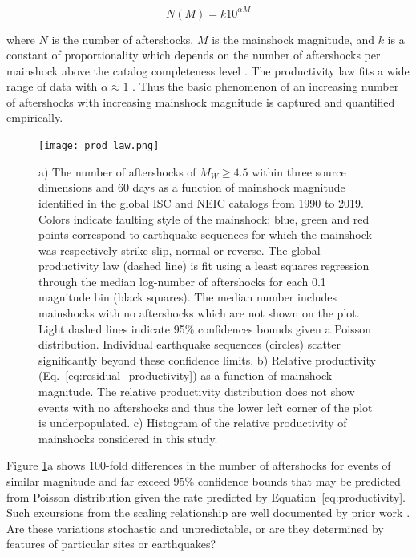 \documentclass[draft, jgrga]{agujournal2018}
\begin{document}
\begin{linenomath*}
\begin{equation}\label{eq:productivity}
    N(M)=k10^{\alpha M}
\end{equation}
\end{linenomath*}
%
where $N$ is the number of aftershocks, $M$ is the mainshock magnitude, and $k$ is a constant of proportionality which depends on the number of aftershocks
per mainshock above the catalog completeness level \citep{Reasenberg1989}. The productivity law fits a wide range of data with $\alpha\approx1$ \citep{Reasenberg1989, Yamanaka1990scalingshock,  DeArcangelis2016, Kisslinger1996,Tahir2015,Tahir2014Aftershock2005, Page}. Thus the basic phenomenon of an increasing number of aftershocks with increasing mainshock magnitude is captured and quantified empirically.

    \begin{figure}
        \centering
        \texttt{[image: prod\_law.png]}
        \caption{a) The number of aftershocks of $M_W\ge4.5$ within three source dimensions and 60 days as a function of mainshock magnitude identified in the global ISC and NEIC catalogs from 1990 to 2019. Colors indicate faulting style of the mainshock; blue, green and red points correspond to earthquake sequences for which the mainshock was respectively strike-slip, normal or reverse. The global productivity law (dashed line) is fit using a least squares regression through the median log-number of aftershocks for each 0.1 magnitude bin (black squares). The median number includes mainshocks with no aftershocks which are not shown on the plot. Light dashed lines indicate 95\% confidences bounds given a Poisson distribution. Individual earthquake sequences (circles) scatter significantly beyond these confidence limits. b) Relative productivity (Eq.~\ref{eq:residual_productivity}) as a function of mainshock magnitude. The relative productivity distribution does not show events with no aftershocks and thus the lower left corner of the plot is underpopulated. c) Histogram of the relative productivity of mainshocks considered in this study.
        }
        \label{fig:fms_prod}
    \end{figure}

 Figure \ref{fig:fms_prod}a shows 100-fold differences in the number of aftershocks for events of similar magnitude and far exceed 95\% confidence bounds that may be predicted from Poisson distribution given the rate predicted by Equation~\ref{eq:productivity}. Such excursions from the scaling relationship are well documented by prior work \citep[e.g.][]{Marsan2017HowAftershocks,Boettcher2004EarthquakeFaults,Page,Tahir2014Aftershock2005}. Are these variations stochastic and unpredictable, or are they determined by features of particular sites or earthquakes?
\end{document}
